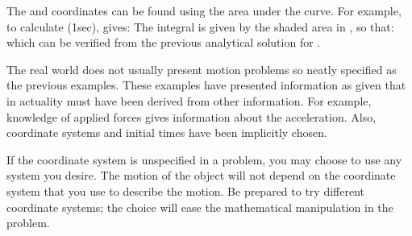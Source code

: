 {The  and  coordinates can be found using the area under the curve.
For example, to calculate (1\unit{sec}),  gives:
%
%
The integral is given by the shaded area
%
%
in , so that:
%
%
which can be verified from the previous analytical solution for .

The real world does not usually present motion problems so neatly
specified as the previous examples.
These examples have presented information as given that in
actuality must have been derived from other information.
For example, knowledge of applied forces gives information about
the acceleration.
%
%
Also, coordinate systems and initial times have been implicitly chosen.

If the coordinate system is unspecified in a problem, you may
choose to use any system you desire.
The motion of the object will not depend on the coordinate system
that you use to describe the motion.
Be prepared to try different coordinate systems; the 
choice will ease the mathematical manipulation in the problem.
}%
%

